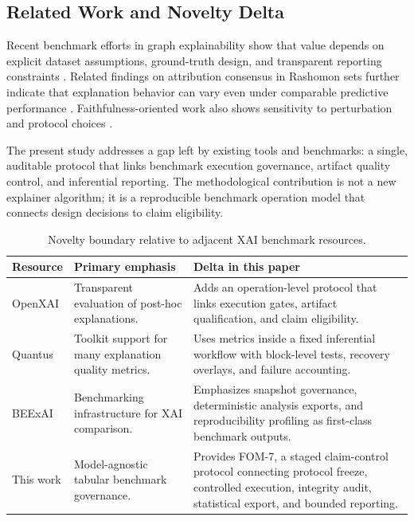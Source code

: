 \documentclass[twoside,11pt]{article}
\begin{document}
\subsection{Related Work and Novelty Delta}
Recent benchmark efforts in graph explainability show that value depends on
explicit dataset assumptions, ground-truth design, and transparent reporting
constraints \citep{agarwal2023gnn_eval,proszewska2025bxaic}. Related findings
on attribution consensus in Rashomon sets further indicate that explanation
behavior can vary even under comparable predictive performance
\citep{laberge2023rashomon}. Faithfulness-oriented work also shows sensitivity
to perturbation and protocol choices \citep{zheng2025ffidelity}.

The present study addresses a gap left by existing tools and benchmarks: a
single, auditable protocol that links benchmark execution governance, artifact
quality control, and inferential reporting. The methodological contribution is
not a new explainer algorithm; it is a reproducible benchmark operation model
that connects design decisions to claim eligibility.

\begin{table}[t]
\centering
\caption{Novelty boundary relative to adjacent XAI benchmark resources.}
\begin{tabularx}{\linewidth}{l X X}
\toprule
\textbf{Resource} & \textbf{Primary emphasis} & \textbf{Delta in this paper} \\
\midrule
OpenXAI \citep{agarwal2022openxai} & Transparent evaluation of post-hoc explanations. & Adds an operation-level protocol that links execution gates, artifact qualification, and claim eligibility. \\
Quantus \citep{hedstrom2023quantus} & Toolkit support for many explanation quality metrics. & Uses metrics inside a fixed inferential workflow with block-level tests, recovery overlays, and failure accounting. \\
BEExAI \citep{sithakoul2024beexai} & Benchmarking infrastructure for XAI comparison. & Emphasizes snapshot governance, deterministic analysis exports, and reproducibility profiling as first-class benchmark outputs. \\
This work & Model-agnostic tabular benchmark governance. & Provides FOM-7, a staged claim-control protocol connecting protocol freeze, controlled execution, integrity audit, statistical export, and bounded reporting. \\
\bottomrule
\end{tabularx}
\label{tab:novelty-delta}
\end{table}
\end{document}
